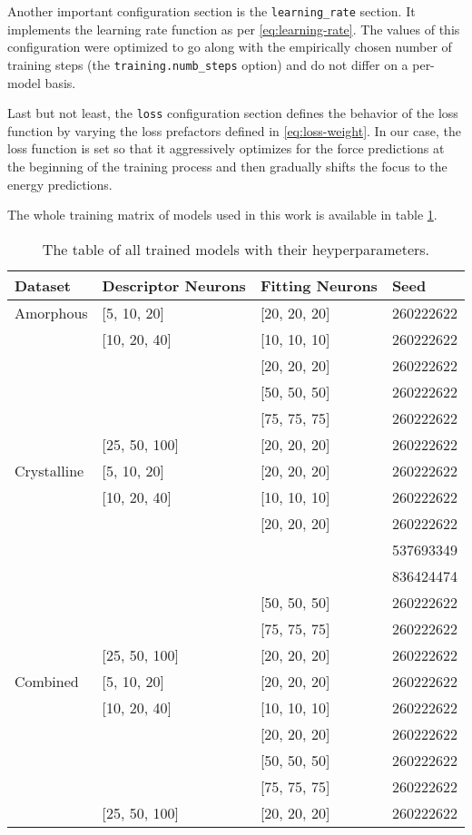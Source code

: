 Another important configuration section is the \texttt{learning\_rate}
section. It implements the learning rate function as per
\eqref{eq:learning-rate}. The values of this configuration were optimized to
go along with the empirically chosen number of training steps
(the \texttt{training.numb\_steps} option) and do not differ on a per-model
basis.

Last but not least, the \texttt{loss} configuration section defines the
behavior of the loss function by varying the loss prefactors defined in
\eqref{eq:loss-weight}. In our case, the loss function is set so that it
aggressively optimizes for the force predictions at the beginning of the
training process and then gradually shifts the focus to the energy
predictions.

The whole training matrix of models used in this work is available in table
\ref{tab:models}.

\begin{table}
  \begin{tabularx}{\textwidth}{llll}
    \toprule
    Dataset & Descriptor Neurons & Fitting Neurons & Seed \\
    \midrule
    Amorphous & [5, 10, 20] & [20, 20, 20] & 260222622 \\
     & [10, 20, 40] & [10, 10, 10] & 260222622 \\
     & & [20, 20, 20] & 260222622 \\
     & & [50, 50, 50] & 260222622 \\
     & & [75, 75, 75] & 260222622 \\
     & [25, 50, 100] & [20, 20, 20] & 260222622 \\
    \midrule
    Crystalline & [5, 10, 20] & [20, 20, 20] & 260222622 \\
     & [10, 20, 40] & [10, 10, 10] & 260222622 \\
     & & [20, 20, 20] & 260222622 \\
     & & & 537693349 \\
     & & & 836424474 \\
     & & [50, 50, 50] & 260222622 \\
     & & [75, 75, 75] & 260222622 \\
     & [25, 50, 100] & [20, 20, 20] & 260222622 \\
    \bottomrule
    Combined & [5, 10, 20] & [20, 20, 20] & 260222622 \\
     & [10, 20, 40] & [10, 10, 10] & 260222622 \\
     & & [20, 20, 20] & 260222622 \\
     & & [50, 50, 50] & 260222622 \\
     & & [75, 75, 75] & 260222622 \\
     & [25, 50, 100] & [20, 20, 20] & 260222622 \\
  \end{tabularx}
  \caption{The table of all trained models with their heyperparameters.}
  \label{tab:models}
\end{table}
